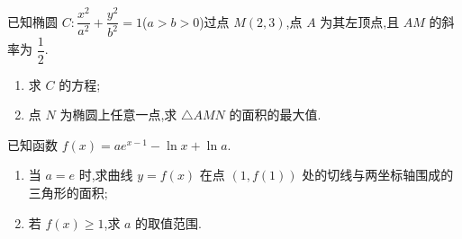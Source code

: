 \begin{problem}
已知椭圆 \(C:\dfrac{x^2}{a^2}+\dfrac{y^2}{b^2}=1\)(\(a>b>0\))过点 \(M(2,3)\),点 \(A\) 为其左顶点,且 \(AM\) 的斜率为 \(\dfrac12\).

\begin{enumerate}
\item 求 \(C\) 的方程;
\item 点 \(N\) 为椭圆上任意一点,求 \(\triangle AMN\) 的面积的最大值.
\end{enumerate}
\end{problem}

\begin{problem}
已知函数 \(f(x)=ae^{x-1}-\ln x+\ln a\).

\begin{enumerate}
\item 当 \(a=e\) 时,求曲线 \(y=f(x)\) 在点 \((1,f(1))\) 处的切线与两坐标轴围成的三角形的面积;
\item 若 \(f(x)\geqslant1\),求 \(a\) 的取值范围.
\end{enumerate}
\end{problem}

